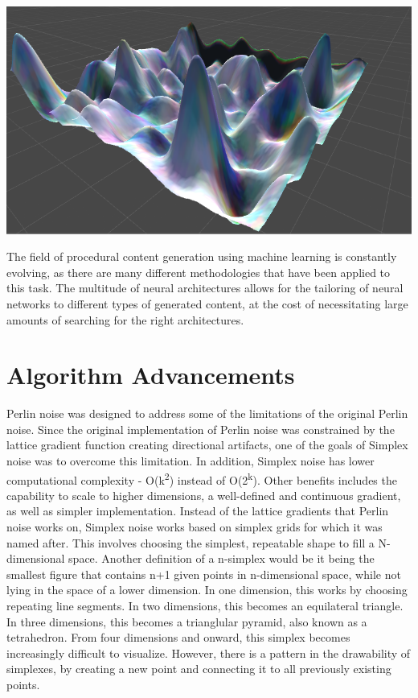 \documentclass[10pt]{report}
\begin{document}
		\begin{minipage}{\textwidth}
			\centering
			\includegraphics[scale=.3]{rolling}
			\label{fig:dl-noise}
		\end{minipage}
	
		The field of procedural content generation using machine learning is constantly evolving, as there are many different methodologies that have been applied to this task. The multitude of neural architectures allows for the tailoring of neural networks to different types of generated content, at the cost of necessitating large amounts of searching for the right architectures.
		
		\cite{Liu_2020}
		
		\section{Algorithm Advancements}
		
		Perlin noise was designed to address some of the limitations of the original Perlin noise. Since the original implementation of Perlin noise was constrained by the lattice gradient function creating directional artifacts, one of the goals of Simplex noise was to overcome this limitation. In addition, Simplex noise has lower computational complexity - O(k\textsuperscript{2}) instead of O(2\textsuperscript{k})\cite{sheet-simplex}. Other benefits includes the capability to scale to higher dimensions, a well-defined and continuous gradient, as well as simpler implementation. Instead of the lattice gradients that Perlin noise works on, Simplex noise works based on simplex grids for which it was named after. This involves choosing the simplest, repeatable shape to fill a N-dimensional space. Another definition of a n-simplex would be it being the smallest figure that contains n+1 given points in n-dimensional space, while not lying in the space of a lower dimension. In one dimension, this works by choosing repeating line segments. In two dimensions, this becomes an equilateral triangle. In three dimensions, this becomes a trianglular pyramid, also known as a tetrahedron. From four dimensions and onward, this simplex becomes increasingly difficult to visualize. However, there is a pattern in the drawability of simplexes, by creating a new point and connecting it to all previously existing points.
		
\end{document}
